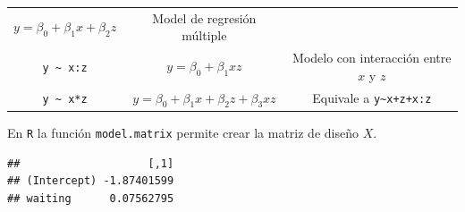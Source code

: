 \documentclass[]{article}
\newenvironment{Shaded}{\begin{snugshade}}{\end{snugshade}}
\newcommand{\KeywordTok}[1]{\textcolor[rgb]{0.13,0.29,0.53}{\textbf{{#1}}}}
\newcommand{\DataTypeTok}[1]{\textcolor[rgb]{0.13,0.29,0.53}{{#1}}}
\newcommand{\StringTok}[1]{\textcolor[rgb]{0.31,0.60,0.02}{{#1}}}
\newcommand{\NormalTok}[1]{{#1}}
\numberwithin{equation}{section}
\begin{document}
\begin{longtable}[]{@{}ccc@{}}
\begin{minipage}[t]{0.29\columnwidth}
\(y = \beta_0+\beta_1x+\beta_2z\)\strut
\end{minipage} & \begin{minipage}[t]{0.48\columnwidth}\centering\strut
Model de regresión múltiple\strut
\end{minipage}\tabularnewline
\begin{minipage}[t]{0.14\columnwidth}\centering\strut
\texttt{y\ \textasciitilde{}\ x:z}\strut
\end{minipage} & \begin{minipage}[t]{0.29\columnwidth}\centering\strut
\(y = \beta_0+\beta_1xz\)\strut
\end{minipage} & \begin{minipage}[t]{0.48\columnwidth}\centering\strut
Modelo con interacción entre \(x\) y \(z\)\strut
\end{minipage}\tabularnewline
\begin{minipage}[t]{0.14\columnwidth}\centering\strut
\texttt{y\ \textasciitilde{}\ x*z}\strut
\end{minipage} & \begin{minipage}[t]{0.29\columnwidth}\centering\strut
\(y = \beta_0+\beta_1x+\beta_2z+\beta_3xz\)\strut
\end{minipage} & \begin{minipage}[t]{0.48\columnwidth}\centering\strut
Equivale a \texttt{y\textasciitilde{}x+z+x:z}\strut
\end{minipage}\tabularnewline
\bottomrule
\end{longtable}

En \texttt{R} la función \texttt{model.matrix} permite crear la matriz
de diseño \(X\).

\begin{Shaded}
\end{Shaded}

\begin{verbatim}
##                    [,1]
## (Intercept) -1.87401599
## waiting      0.07562795
\end{verbatim}
\end{document}
